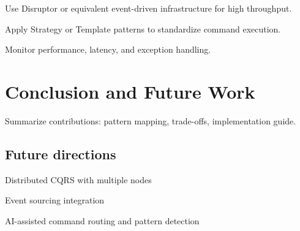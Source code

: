 \documentclass{article}
\begin{document}
Use Disruptor or equivalent event-driven infrastructure for high throughput.

Apply Strategy or Template patterns to standardize command execution.

Monitor performance, latency, and exception handling.

\section{Conclusion and Future Work}
Summarize contributions: pattern mapping, trade-offs, implementation guide.

\subsection{Future directions}
Distributed CQRS with multiple nodes

Event sourcing integration

AI-assisted command routing and pattern detection



\end{document}
